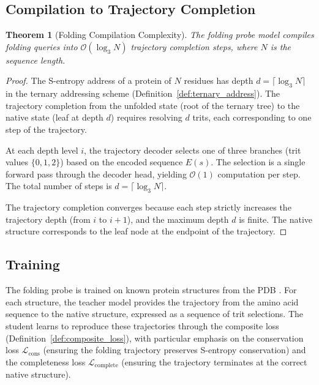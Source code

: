 \documentclass[11pt,twocolumn,a4paper]{article}
\newtheorem{theorem}{Theorem}[section]
\theoremstyle{definition}
\theoremstyle{remark}
\newcommand{\loss}{\mathcal{L}}
\begin{document}
\subsection{Compilation to Trajectory Completion}

\begin{theorem}[Folding Compilation Complexity]
\label{thm:folding_complexity}
The folding probe model compiles folding queries into $\mathcal{O}(\log_3 N)$ trajectory completion steps, where $N$ is the sequence length.
\end{theorem}

\begin{proof}
The S-entropy address of a protein of $N$ residues has depth $d = \lceil \log_3 N \rceil$ in the ternary addressing scheme (Definition~\ref{def:ternary_address}). The trajectory completion from the unfolded state (root of the ternary tree) to the native state (leaf at depth $d$) requires resolving $d$ trits, each corresponding to one step of the trajectory.

At each depth level $i$, the trajectory decoder selects one of three branches (trit values $\{0, 1, 2\}$) based on the encoded sequence $E(s)$. The selection is a single forward pass through the decoder head, yielding $\mathcal{O}(1)$ computation per step. The total number of steps is $d = \lceil \log_3 N \rceil$.

The trajectory completion converges because each step strictly increases the trajectory depth (from $i$ to $i+1$), and the maximum depth $d$ is finite. The native structure corresponds to the leaf node at the endpoint of the trajectory.
\end{proof}

\subsection{Training}

The folding probe is trained on known protein structures from the PDB \citep{berman2000}. For each structure, the teacher model provides the trajectory from the amino acid sequence to the native structure, expressed as a sequence of trit selections. The student learns to reproduce these trajectories through the composite loss (Definition~\ref{def:composite_loss}), with particular emphasis on the conservation loss $\loss_{\mathrm{cons}}$ (ensuring the folding trajectory preserves S-entropy conservation) and the completeness loss $\loss_{\mathrm{complete}}$ (ensuring the trajectory terminates at the correct native structure).
\end{document}
